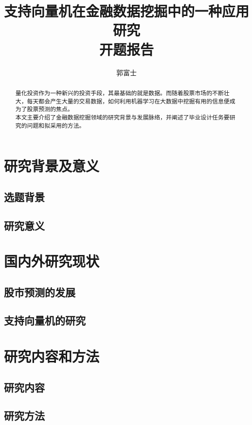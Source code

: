 \documentclass[lang=cn,11pt,a4paper]{elegantpaper}
\title{支持向量机在金融数据挖掘中的一种应用研究 \\ 开题报告}
\author{郭富士}
\institute{南京航空航天大学}
\date{\zhtoday}
\begin{document}
    \maketitle

    \begin{abstract}
        量化投资作为一种新兴的投资手段，其最基础的就是数据。而随着股票市场的不断壮大，每天都会产生大量的交易数据，如何利用机器学习在大数据中挖掘有用的信息便成为了股票预测的焦点。\\
        本文主要介绍了金融数据挖掘领域的研究背景与发展脉络，并阐述了毕业设计任务要研究的问题和拟采用的方法。
    \end{abstract}

    \section{研究背景及意义}
        \subsection{选题背景}

        \subsection{研究意义}

    \section{国内外研究现状}
        \subsection{股市预测的发展}

        \subsection{支持向量机的研究}

    \section{研究内容和方法}
        \subsection{研究内容}

        \subsection{研究方法}
            
\end{document}
